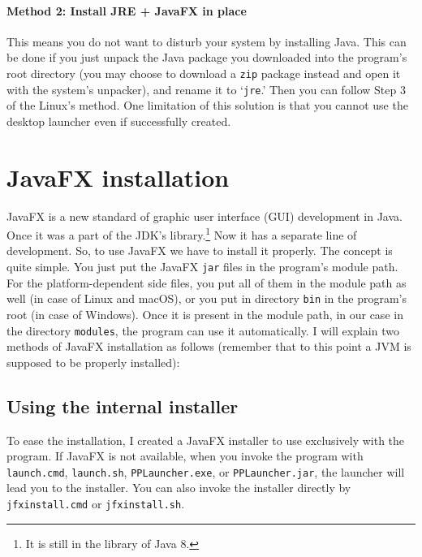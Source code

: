 \paragraph{Method 2: Install JRE + JavaFX in place} This means you do not want to disturb your system by installing Java. This can be done if you just unpack the Java package you downloaded into the program's root directory (you may choose to download a \texttt{zip} package instead and open it with the system's unpacker), and rename it to `\texttt{jre}.' Then you can follow Step 3 of the Linux's method. One limitation of this solution is that you cannot use the desktop launcher even if successfully created.

\section{JavaFX installation}\label{sect:javafx-installation}

JavaFX is a new standard of graphic user interface (GUI) development in Java. Once it was a part of the JDK's library.\footnote{It is still in the library of Java 8.} Now it has a separate line of development. So, to use JavaFX we have to install it properly. The concept is quite simple. You just put the JavaFX \texttt{jar} files in the program's module path. For the platform-dependent side files, you put all of them in the module path as well (in case of Linux and macOS), or you put in directory  \texttt{bin} in the program's root (in case of Windows). Once it is present in the module path, in our case in the directory \texttt{modules}, the program can use it automatically. I will explain two methods of JavaFX installation as follows (remember that to this point a JVM is supposed to be properly installed):

\subsection{Using the internal installer}

To ease the installation, I created a JavaFX installer to use exclusively with the program. If JavaFX is not available, when you invoke the program with \texttt{launch.cmd}, \texttt{launch.sh}, \texttt{PPLaun\-cher.exe}, or \texttt{PPLauncher.jar}, the launcher will lead you to the installer. You can also invoke the installer directly by \texttt{jfxinst\-all.cmd} or \texttt{jfxinstall.sh}.


